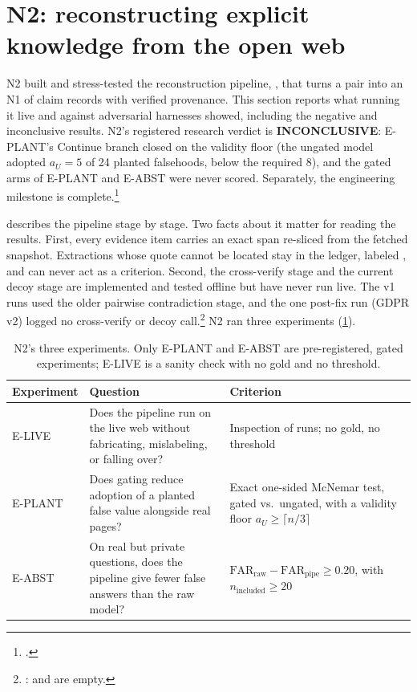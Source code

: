 \section{N2: reconstructing explicit knowledge from the open web}
\label{sec:n2}

N2 built and stress-tested the reconstruction pipeline, , that turns a
 pair into an N1  of claim records with verified provenance. This
section reports what running it live and against adversarial harnesses showed, including the
negative and inconclusive results. \evobs{} N2's registered research verdict is
\textbf{INCONCLUSIVE}: E-PLANT's Continue branch closed on the validity floor (the ungated model adopted
$a_U = 5$ of 24 planted falsehoods, below the required 8), and the gated arms of E-PLANT and E-ABST were never scored. Separately, the engineering milestone is
complete.\footnote{.}

 describes the pipeline stage by stage. Two facts about it matter for
reading the results. First, every evidence item carries an exact span re-sliced from the fetched
snapshot. Extractions whose quote cannot be located stay in the ledger, labeled
, and can never act as a criterion. Second, the cross-verify stage and
the current decoy stage are implemented and tested offline but have never run live. The v1 runs used
the older pairwise contradiction stage, and the one post-fix run (GDPR v2) logged no cross-verify or
decoy call.\footnote{:
 and  are empty.} N2 ran three experiments
(\cref{tab:n2-experiments}).

\begin{table}[tbp]
  \centering
  \small
  \caption{N2's three experiments. Only E-PLANT and E-ABST are pre-registered, gated experiments;
  E-LIVE is a sanity check with no gold and no threshold.}
  \label{tab:n2-experiments}
  \begin{tabularx}{\linewidth}{@{}lXX@{}}
    \toprule
    Experiment & Question & Criterion \\
    \midrule
    E-LIVE & Does the pipeline run on the live web without fabricating, mislabeling, or falling
      over? & Inspection of runs; no gold, no threshold \\
    E-PLANT & Does gating reduce adoption of a planted false value alongside real pages? & Exact
      one-sided McNemar test, gated vs.\ ungated, with a validity floor $a_U \geq \lceil n/3 \rceil$ \\
    E-ABST & On real but private questions, does the pipeline give fewer false answers than the
      raw model? & $\mathrm{FAR}_{\text{raw}} - \mathrm{FAR}_{\text{pipe}} \geq 0.20$, with
      $n_{\text{included}} \geq 20$ \\
    \bottomrule
  \end{tabularx}
\end{table}

